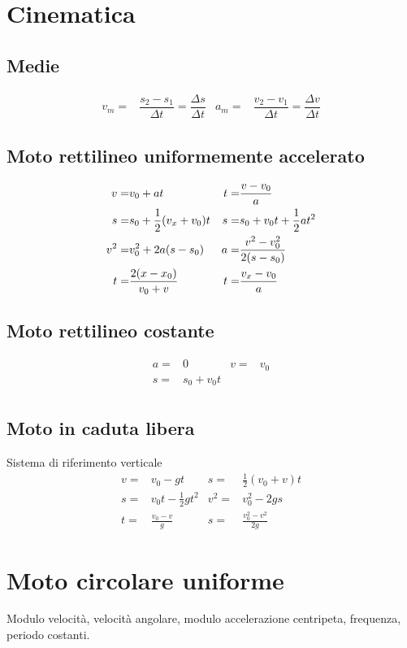 \chapter{Cinematica}
\section{Medie}
\begin{align*}
v_m=&\dfrac{s_2-s_1}{\Delta t}=\dfrac{\Delta s}{\Delta t}&a_m=&\dfrac{v_2-v_1}{\Delta t}=\dfrac{\Delta v}{\Delta t}
\end{align*}
\section{Moto rettilineo uniformemente accelerato}
\begin{align*}\index{Moto!rettiline!accelerato}
v=&v_0+at&
t=&\dfrac{v-v_0}{a}\\
s=&s_0+\frac{1}{2}(v_x+v_0)t&
s=&s_0+v_0t+\frac{1}{2}at^2\\
v^2=&v_{0}^2+2a(s-s_0)&
a=&\frac{v^2-v_{0}^2}{2(s-s_0)}\\
t=&\frac{2(x-x_0)}{v_0+v}&
t=&\frac{v_x-v_0}{a}
\end{align*}
\section{Moto rettilineo costante}
\begin{align*}
a=&0&
v=&v_0\\
s=&s_0+v_0t\\
\end{align*}
\section{Moto in caduta libera}
Sistema di riferimento verticale 
\begin{align*}
v=&v_0-gt&
s=&\frac{1}{2}(v_0+v)t\\
s=&v_0t-\frac{1}{2}gt^2&
v^2=&v_{0}^2-2gs\\
t=&\frac{v_0-v}{g}&
s=&\frac{v_{0}^2-v^2}{2g}
\end{align*}
\chapter{Moto circolare uniforme}
{\centering
	
	\par}
Modulo velocità, velocità angolare, modulo accelerazione centripeta, frequenza, periodo costanti. 

